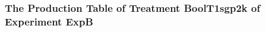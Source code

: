  \begin{frame}
 \fontsize{8pt}{9pt}\selectfont
 \frametitle{ The Production Table of Treatment BoolT1sgp2k of Experiment ExpB }

 \label{ExpBGrammarTable005.tex}  
 \end{frame}

